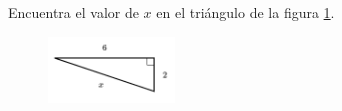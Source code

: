 \question[15]  Encuentra el valor de $x$ en el triángulo de la figura \ref{fig:lados_pitagoras_21}.
\begin{figure}[H]
    \begin{center}
        \includegraphics[width=0.3\textwidth]{../images/lados_pitagoras_21.png}
    \end{center}
    \caption{}
    \label{fig:lados_pitagoras_21}
\end{figure}
